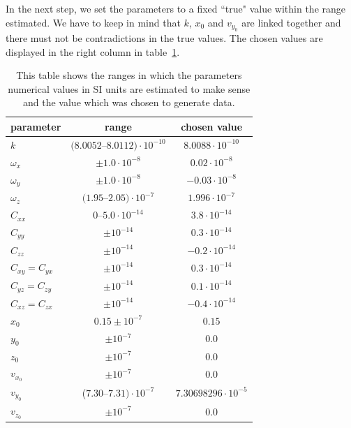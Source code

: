 \documentclass[prb,preprint]{revtex4-1}
\begin{document}
In the next step, we set the parameters to a fixed ``true" value within the range estimated. We have to keep in mind that $k$, $x_0$ and $v_{y_0}$ are linked together and there must not be contradictions in the true values. The chosen values are displayed in the right column in table~\ref{tab:parameters}.\\

\begin{table}[h]
	\centering
	\caption{This table shows the ranges in which the parameters numerical values in SI units are estimated to make sense and the value which was chosen to generate data.}
	\begin{ruledtabular}
		\begin{tabular}{l c c}
			parameter & range & chosen value \\
			\hline	%
			$k$ & $(8.0052$--$8.0112) \cdot 10^{-10}$ & $8.0088 \cdot 10^{-10}$ \\
			$\omega_x$ & $\pm 1.0 \cdot 10^{-8}$ & $0.02 \cdot 10^{-8}$ \\
			$\omega_y$ & $\pm 1.0 \cdot 10^{-8}$ & $-0.03 \cdot 10^{-8}$ \\
			$\omega_z$ & $(1.95$--$2.05) \cdot 10^{-7}$ & $1.996 \cdot 10^{-7}$ \\
			$C_{xx}$ & $0$--$5.0 \cdot 10^{-14}$ & $3.8 \cdot 10^{-14}$ \\
			$C_{yy}$ & $\pm 10^{-14}$ & $0.3 \cdot 10^{-14}$ \\
			$C_{zz}$ & $\pm 10^{-14}$ & $-0.2 \cdot 10^{-14}$ \\
			$C_{xy} = C_{yx}$ & $\pm 10^{-14}$ & $0.3 \cdot 10^{-14}$ \\
			$C_{yz} = C_{zy}$ & $\pm 10^{-14}$ & $0.1 \cdot 10^{-14}$ \\
			$C_{xz} = C_{zx}$ & $\pm 10^{-14}$ & $-0.4 \cdot 10^{-14}$ \\
			$x_0$ & $0.15 \pm 10^{-7}$ & $0.15$ \\
			$y_0$ & $\pm 10^{-7}$ & $0.0$ \\ 
			$z_0$ & $\pm 10^{-7}$ & $0.0$ \\ 
			$v_{x_0}$ & $\pm 10^{-7}$ & $0.0$ \\ 
			$v_{y_0}$ & ($7.30$--$7.31) \cdot 10^{-7}$ & $7.30698296 \cdot 10^{-5}$ \\
			$v_{z_0}$ & $\pm 10^{-7}$ & $0.0$ \\
		\end{tabular}
	\end{ruledtabular}
	\label{tab:parameters}
\end{table}
\end{document}
